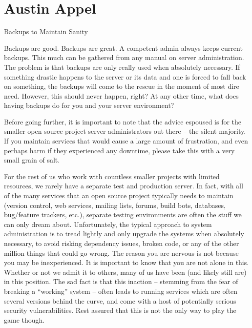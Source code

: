 
\chapter{Austin Appel}{Backups to Maintain Sanity}

Backups are good. Backups are great. A competent admin always keeps current
backups.  This much can be gathered from any manual on server administration.
The problem is that backups are only really used when absolutely necessary.
If something drastic happens to the server or its data and one is forced to fall
back on something, the backups will come to the rescue in the moment of most
dire need. However, this should never happen, right? At any other time, what does
having backups do for you and your server environment?

Before going further, it is important to note that the advice espoused is for
the smaller open source project server administrators out there -- the silent
majority. If you maintain services that would cause a large amount of
frustration, and even perhaps harm if they experienced any downtime, please take
this with a very small grain of salt.

For the rest of us who work with countless smaller projects with limited
resources, we rarely have a separate test and production server. In fact, with
all of the many services that an open source project typically needs to maintain
(version control, web services, mailing lists, forums, build bots, databases,
bug/feature trackers, etc.), separate testing environments are often the stuff
we can only dream about. Unfortunately, the typical approach to system
administration is to tread lightly and only upgrade the systems when absolutely
necessary, to avoid risking dependency issues, broken code, or any of the other
million things that could go wrong. The reason you are nervous is not because
you may be inexperienced. It is important to know that you are not alone in
this. Whether or not we admit it to others, many of us have been (and likely
still are) in this position. The sad fact is that this inaction -- stemming from
the fear of breaking a ``working'' system -- often leads to running services which 
are often several versions behind the curve, and come with a host of potentially
serious security vulnerabilities. Rest assured that this is not the only way to play
the game though.

